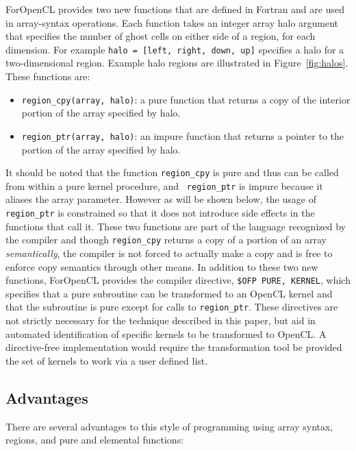 ForOpenCL provides two new functions that are defined in Fortran and are used
in array-syntax operations.  Each function takes an integer array halo argument
that specifies the number of ghost cells on either side of a region, for each
dimension.  For example {\tt halo = [left, right, down, up]} specifies a halo
for a two-dimensional region.  Example halo regions are illustrated in
Figure~\ref{fig:halos}.  These functions are:

\begin{itemize}

\item {\tt region\_cpy(array, halo)}: a pure function that returns a copy of
  the interior portion of the array specified by halo.

\item {\tt region\_ptr(array, halo)}: an impure function that returns a pointer 
  to the portion of the array specified by halo.

\end{itemize}

It should be noted that the function {\tt region\_cpy} is pure and thus can be
called from within a pure kernel procedure, and {\tt
region\_ptr} is impure because it aliases the array parameter.  However as will
be shown below, the usage of {\tt region\_ptr} is constrained so that it does not
introduce side effects in the functions that call it.  These two functions are
part of the language recognized by the compiler and though {\tt region\_cpy}
returns a copy of a portion of an array \emph{semantically}, the compiler is not
forced to actually make a copy and is free to enforce copy semantics through
other means.  In addition to these two new functions, ForOpenCL provides the
compiler directive, {\tt \!\$OFP PURE, KERNEL}, which specifies that a pure subroutine
can be transformed to an OpenCL kernel and that the subroutine is pure
except for calls to {\tt region\_ptr}.  These directives are not strictly
necessary for the technique described in this paper, but aid in automated
identification of specific kernels to be transformed to OpenCL.  A directive-free
implementation would require the transformation tool be provided the set of 
kernels to work via a user defined list.

\subsection{Advantages}

There are several advantages to this style of programming using array
syntax, regions, and pure and elemental functions:

